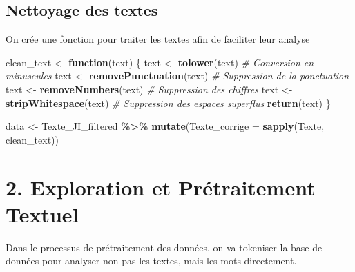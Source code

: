 \documentclass[
]{article}
\newenvironment{Shaded}{\begin{snugshade}}{\end{snugshade}}
\newcommand{\AttributeTok}[1]{\textcolor[rgb]{0.13,0.29,0.53}{#1}}
\newcommand{\CommentTok}[1]{\textcolor[rgb]{0.56,0.35,0.01}{\textit{#1}}}
\newcommand{\ControlFlowTok}[1]{\textcolor[rgb]{0.13,0.29,0.53}{\textbf{#1}}}
\newcommand{\FunctionTok}[1]{\textcolor[rgb]{0.13,0.29,0.53}{\textbf{#1}}}
\newcommand{\NormalTok}[1]{#1}
\newcommand{\OtherTok}[1]{\textcolor[rgb]{0.56,0.35,0.01}{#1}}
\newcommand{\SpecialCharTok}[1]{\textcolor[rgb]{0.81,0.36,0.00}{\textbf{#1}}}
\begin{document}
\subsection{Nettoyage des textes}\label{nettoyage-des-textes}

On crée une fonction pour traiter les textes afin de faciliter leur
analyse

\begin{Shaded}
\begin{Highlighting}[]
\NormalTok{clean\_text }\OtherTok{\textless{}{-}} \ControlFlowTok{function}\NormalTok{(text) \{}
\NormalTok{  text }\OtherTok{\textless{}{-}} \FunctionTok{tolower}\NormalTok{(text)           }\CommentTok{\# Conversion en minuscules}
\NormalTok{  text }\OtherTok{\textless{}{-}} \FunctionTok{removePunctuation}\NormalTok{(text) }\CommentTok{\# Suppression de la ponctuation}
\NormalTok{  text }\OtherTok{\textless{}{-}} \FunctionTok{removeNumbers}\NormalTok{(text)     }\CommentTok{\# Suppression des chiffres}
\NormalTok{  text }\OtherTok{\textless{}{-}} \FunctionTok{stripWhitespace}\NormalTok{(text)   }\CommentTok{\# Suppression des espaces superflus}
  \FunctionTok{return}\NormalTok{(text)}
\NormalTok{\}}

\NormalTok{data }\OtherTok{\textless{}{-}}\NormalTok{ Texte\_JI\_filtered }\SpecialCharTok{\%\textgreater{}\%}
  \FunctionTok{mutate}\NormalTok{(}\AttributeTok{Texte\_corrige =} \FunctionTok{sapply}\NormalTok{(Texte, clean\_text))}
\end{Highlighting}
\end{Shaded}

\section{2. Exploration et Prétraitement
Textuel}\label{exploration-et-pruxe9traitement-textuel}

Dans le processus de prétraitement des données, on va tokeniser la base
de données pour analyser non pas les textes, mais les mots directement.
\end{document}
